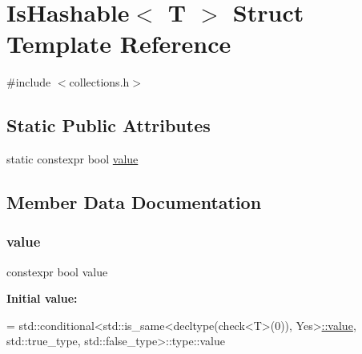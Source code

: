 \hypertarget{structstanfordcpplib_1_1collections_1_1IsHashable}{}\section{Is\+Hashable$<$ T $>$ Struct Template Reference}
\label{structstanfordcpplib_1_1collections_1_1IsHashable}


{\ttfamily \#include $<$collections.\+h$>$}

\subsection*{Static Public Attributes}
\begin{DoxyCompactItemize}
\item 
static constexpr bool \mbox{\hyperlink{structstanfordcpplib_1_1collections_1_1IsHashable_a5b4ee4ae6cba6bb75200ba7af1910873}{value}}
\end{DoxyCompactItemize}


\subsection{Member Data Documentation}
\mbox{\label{structstanfordcpplib_1_1collections_1_1IsHashable_a5b4ee4ae6cba6bb75200ba7af1910873}} 
\subsubsection{\texorpdfstring{value}{value}}
{\footnotesize\ttfamily constexpr bool value\hspace{0.3cm}{\ttfamily [static]}}

{\bfseries Initial value\+:}
\begin{DoxyCode}
=
            std::conditional<std::is\_same<decltype(check<T>(0)), Yes>\mbox{\hyperlink{structstanfordcpplib_1_1collections_1_1IsHashable_a5b4ee4ae6cba6bb75200ba7af1910873}{::value}},
                             std::true\_type,
                             std::false\_type>::type::value
\end{DoxyCode}
